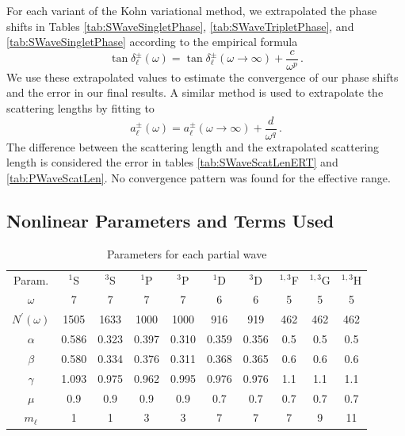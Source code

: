 \documentclass[preprint,showpacs,preprintnumbers,amsmath,amssymb,longbibliography,pra,aps]{revtex4-1}
\begin{document}
For each variant of the Kohn variational method, we extrapolated the phase shifts in Tables \ref{tab:SWaveSingletPhase}, \ref{tab:SWaveTripletPhase}, and \ref{tab:SWaveSingletPhase} according to the empirical formula \cite{VanReeth2003}
\begin{equation}
\label{eq:Extrap}
\tan\delta_\ell^\pm(\omega) = \tan\delta_\ell^\pm(\omega\to\infty) + \frac{c}{\omega^p}\, .
\end{equation}
We use these extrapolated values to estimate the convergence of our phase shifts and the error in our final results.
A similar method is used to extrapolate the scattering lengths by fitting to
\begin{equation}
\label{eq:ExtrapA}
a_\ell^\pm(\omega) = a_\ell^\pm(\omega\to\infty) + \frac{d}{\omega^q}\, .
\end{equation}
The difference between the scattering length and the extrapolated scattering length is considered the error in tables \ref{tab:SWaveScatLenERT} and \ref{tab:PWaveScatLen}. No convergence pattern was found for the effective range.

\subsection{Nonlinear Parameters and Terms Used}
\label{sec:Parameters}

\begin{table}[H]
  \centering
	\begin{ruledtabular}
    \begin{tabular}{cccccccccc}
    Param. & $^1$S & $^3$S & $^1$P & $^3$P & $^1$D & $^3$D & $^{1,3}$F & $^{1,3}$G & $^{1,3}$H \\
    \colrule
	$\omega$           & 7     & 7     & 7     & 7     & 6     & 6     & 5    & 5   & 5 \\
	$N^\prime(\omega)$ & 1505  & 1633  & 1000  & 1000  & 916   & 919   & 462  & 462 & 462 \\
	$\alpha$           & 0.586 & 0.323 & 0.397 & 0.310 & 0.359 & 0.356 & 0.5  & 0.5 & 0.5 \\
	$\beta$            & 0.580 & 0.334 & 0.376 & 0.311 & 0.368 & 0.365 & 0.6  & 0.6 & 0.6 \\
	$\gamma$           & 1.093 & 0.975 & 0.962 & 0.995 & 0.976 & 0.976 & 1.1  & 1.1 & 1.1 \\
	$\mu$              & 0.9   & 0.9   & 0.9   & 0.9   & 0.7   & 0.7   & 0.7  & 0.7 & 0.7 \\
	$m_\ell$           & 1     & 1     & 3     & 3     & 7     & 7     & 7    & 9   & 11 \\
    \end{tabular}
  \end{ruledtabular}
  \caption{Parameters for each partial wave}
  \label{tab:Nonlinear}
\end{table}
\end{document}
